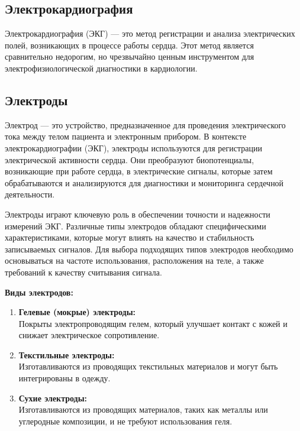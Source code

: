 \documentclass[12pt, russian]{extarticle}
\begin{document}
\begin{spacing}{1.5}
\subsection{Электрокардиография}

Электрокардиография (ЭКГ) — это метод регистрации и анализа электрических полей, возникающих в процессе работы сердца. Этот метод является сравнительно недорогим, но чрезвычайно ценным инструментом для электрофизиологической диагностики в кардиологии.

\subsection{Электроды}

Электрод — это устройство, предназначенное для проведения электрического тока между телом пациента и электронным прибором. В контексте электрокардиографии (ЭКГ), электроды используются для регистрации электрической активности сердца. Они преобразуют биопотенциалы, возникающие при работе сердца, в электрические сигналы, которые затем обрабатываются и анализируются для диагностики и мониторинга сердечной деятельности.

Электроды играют ключевую роль в обеспечении точности и надежности измерений ЭКГ. Различные типы электродов обладают специфическими характеристиками, которые могут влиять на качество и стабильность записываемых сигналов. Для выбора подходящих типов электродов необходимо основываться на частоте использования, расположения на теле, а также требований к качеству считывания сигнала.

\par \noindent \textbf{Виды электродов:}

\begin{enumerate}
    \item \textbf{Гелевые (мокрые) электроды:} \\
        Покрыты электропроводящим гелем, который улучшает контакт с кожей и снижает электрическое сопротивление.
    \item \textbf{Текстильные электроды:} \\
        Изготавливаются из проводящих текстильных материалов и могут быть интегрированы в одежду.
    \item \textbf{Сухие электроды:} \\
        Изготавливаются из проводящих материалов, таких как металлы или углеродные композиции, и не требуют использования геля.
\end{enumerate}


\end{spacing}
\end{document}
